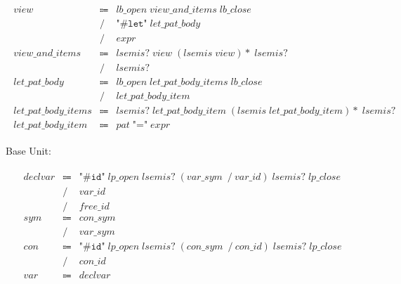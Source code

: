 \begin{align*}
    \begin{array}{rcll}
        \mathit{view}
        &\Coloneq &\mathit{lb\_open}\; \mathit{view\_and\_items}\; \mathit{lb\_close} \\
        &\mathrel{/} &\texttt{"\#let"}\; \mathit{let\_pat\_body} \\
        &\mathrel{/} &\mathit{expr} \\
        \mathit{view\_and\_items}
        &\Coloneq &\mathit{lsemis}{?}\; \mathit{view}\; (\mathit{lsemis}\; \mathit{view}){*}\; \mathit{lsemis}{?} \\
        &\mathrel{/} &\mathit{lsemis}{?} \\
        \mathit{let\_pat\_body}
        &\Coloneq &\mathit{lb\_open}\; \mathit{let\_pat\_body\_items}\; \mathit{lb\_close} \\
        &\mathrel{/} &\mathit{let\_pat\_body\_item} \\
        \mathit{let\_pat\_body\_items}
        &\Coloneq &\mathit{lsemis}{?}\; \mathit{let\_pat\_body\_item}\; (\mathit{lsemis}\; \mathit{let\_pat\_body\_item}){*}\; \mathit{lsemis}{?} \\
        \mathit{let\_pat\_body\_item}
        &\Coloneq &\mathit{pat}\; \texttt{"="}\; \mathit{expr}
    \end{array}
\end{align*}

Base Unit:

\begin{align*}
    \begin{array}{rcll}
        \mathit{declvar}
        &\Coloneq &\texttt{"\#id"}\; \mathit{lp\_open}\; \mathit{lsemis}{?}\; (\mathit{var\_sym}\; \mathrel{/} \mathit{var\_id})\; \mathit{lsemis}{?}\; \mathit{lp\_close} \\
        &\mathrel{/} &\mathit{var\_id} \\
        &\mathrel{/} &\mathit{free\_id} \\
        \mathit{sym}
        &\Coloneq &\mathit{con\_sym} \\
        &\mathrel{/} &\mathit{var\_sym} \\
        \mathit{con}
        &\Coloneq &\texttt{"\#id"}\; \mathit{lp\_open}\; \mathit{lsemis}{?}\; (\mathit{con\_sym}\; \mathrel{/} \mathit{con\_id})\; \mathit{lsemis}{?}\; \mathit{lp\_close} \\
        &\mathrel{/} &\mathit{con\_id} \\
        \mathit{var}
        &\Coloneq &\mathit{declvar}
    \end{array}
\end{align*}

